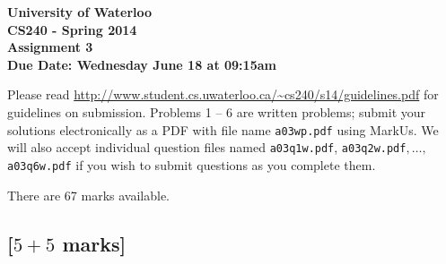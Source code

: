 \documentclass[12pt]{article}
\begin{document}
\begin{center}
  {\Large\bf University of Waterloo}\\
  \vspace{3mm}
         {\Large\bf CS240 - Spring 2014}\\
         \vspace{2mm}
                {\Large\bf Assignment 3}\\
                \vspace{3mm}
                \textbf{Due Date: Wednesday June 18 at 09:15am}
\end{center}

Please read
\url{http://www.student.cs.uwaterloo.ca/~cs240/s14/guidelines.pdf}
for guidelines on submission.  
Problems 1 -- 6 are written
problems; submit your solutions electronically as a PDF with file name {\tt a03wp.pdf} using MarkUs. We will also accept individual question files named {\tt a03q1w.pdf}, {\tt a03q2w.pdf}$, \dots,$ {\tt a03q6w.pdf} if you wish to submit questions as you complete them.

There are 67 marks available.

\subsection{[$5 + 5$ marks]}
\end{document}
